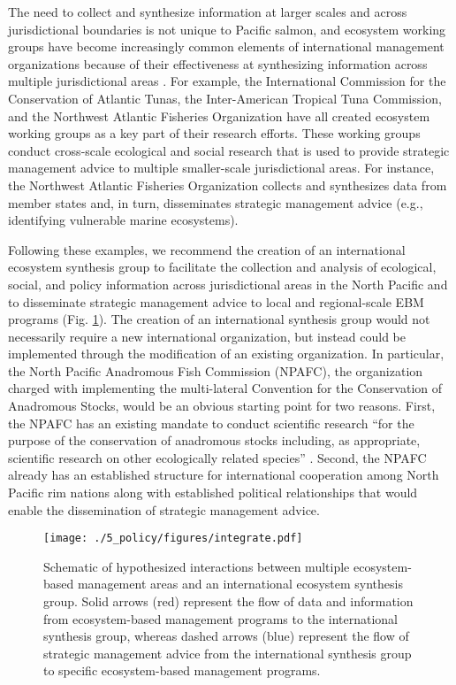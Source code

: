 The need to collect and synthesize information at larger scales and across
jurisdictional boundaries is not unique to Pacific salmon, and ecosystem working
groups have become increasingly common elements of international management
organizations because of their effectiveness at synthesizing information across
multiple jurisdictional areas \citep{Engler2015, Lascelles2014}. For example,
the International Commission for the Conservation of Atlantic Tunas, the
Inter-American Tropical Tuna Commission, and the Northwest Atlantic Fisheries
Organization have all created ecosystem working groups as a key part of their
research efforts. These working groups conduct cross-scale ecological and social
research that is used to provide strategic management advice to multiple
smaller-scale jurisdictional areas. For instance, the Northwest Atlantic
Fisheries Organization collects and synthesizes data from member states and, in
turn, disseminates strategic management advice (e.g., identifying vulnerable
marine ecosystems).

Following these examples, we recommend the creation of an international
ecosystem synthesis group to facilitate the collection and analysis of
ecological, social, and policy information across jurisdictional areas in the
North Pacific and to disseminate strategic management advice to local and
regional-scale EBM programs (Fig. \ref{fig:ebm:4}). The creation of an
international synthesis group would not necessarily require a new international
organization, but instead could be implemented through the modification of an
existing organization. In particular, the North Pacific Anadromous Fish
Commission (NPAFC), the organization charged with implementing the multi-lateral
Convention for the Conservation of Anadromous Stocks, would be an obvious
starting point for two reasons. First, the NPAFC has an existing mandate to
conduct scientific research ``for the purpose of the conservation of anadromous
stocks including, as appropriate, scientific research on other ecologically
related species'' \citep{CCAS1992}. Second, the NPAFC already has an established
structure for international cooperation among North Pacific rim nations along
with established political relationships that would enable the dissemination of
strategic management advice.

\begin{figure}[htbp]
  \centering \texttt{[image: ./5\_policy/figures/integrate.pdf]}
  \caption[Schematic of hypothesized interactions between multiple
           ecosystem-based management areas and an international ecosystem
           synthesis group]{Schematic of hypothesized interactions between
           multiple ecosystem-based management areas and an international
           ecosystem synthesis group. Solid arrows (red) represent the flow of
           data and information from ecosystem-based management programs to the
           international synthesis group, whereas dashed arrows (blue) represent
           the flow of strategic management advice from the international
           synthesis group to specific ecosystem-based management programs.}
  \label{fig:ebm:4}
\end{figure}

